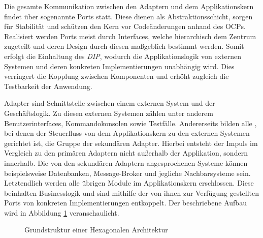 Die gesamte Kommunikation zwischen den Adaptern und dem Applikationskern findet über sogenannte Ports statt. Diese dienen als Abstraktionsschicht, sorgen für Stabilität und schützen den Kern vor Codeänderungen anhand des \acrlong{OCP}s. Realisiert werden Ports meist durch Interfaces, welche hierarchisch dem Zentrum zugeteilt und deren Design durch diesen maßgeblich bestimmt werden. Somit erfolgt die Einhaltung des \emph{\acrlong{DIP}}, wodurch die Applikationslogik von externen Systemen und deren konkreten Implementierungen unabhängig wird. Dies verringert die Kopplung zwischen Komponenten und erhöht zugleich die Testbarkeit der Anwendung. \cite{philipbrown.2014}

Adapter sind Schnittstelle zwischen einem externen System und der Geschäftslogik.  Zu diesen externen Systemen zählen unter anderem Benutzerinterfaces, Kommandokonsolen sowie Testfälle. Andererseits bilden alle , bei denen der Steuerfluss von dem Applikationskern zu den externen Systemen gerichtet ist, die Gruppe der sekundären Adapter. Hierbei entsteht der Impuls im Vergleich zu den primären Adaptern nicht außerhalb der Applikation, sondern innerhalb. Die von den sekundären Adaptern angesprochenen Systeme können beispielsweise Datenbanken, Message-Broker und jegliche Nachbarsysteme sein. Letztendlich werden alle übrigen Module im Applikationskern erschlossen. Diese beinhalten Businesslogik und sind mithilfe der von ihnen zur Verfügung gestellten Ports von konkreten Implementierungen entkoppelt. \cite{hgraca.2017, Griffin.2021b} Der beschriebene Aufbau wird in Abbildung \ref{fig:HexagonaleArchitektur} veranschaulicht. 


\begin{figure}[htbp]
	\centering
	
	\caption{Grundstruktur einer Hexagonalen Architektur}
	\label{fig:HexagonaleArchitektur}
\end{figure}

